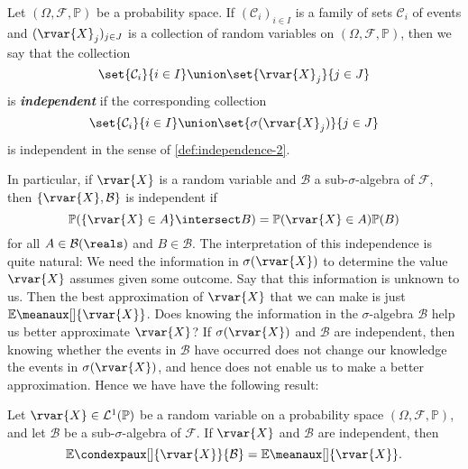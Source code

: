 \documentclass[article, a4paper, 11pt, oneside]{memoir}
\numberwithin{equation}{chapter}
\newcommand{\calB}{\mathcal{B}}
\newcommand{\calF}{\mathcal{F}}
\newcommand{\calC}{\mathcal{C}}
\newcommand{\calL}{\mathcal{L}}
\newcommand{\borel}[1]{\calB(#1)}
\renewcommand{\P}{\mathbb{P}}
\renewcommand{\mean}[2][]{\mathbb{E}\meanaux[#1]{#2}}
\newcommand{\condexp}[3][]{{\mathbb{E}\condexpaux[#1]{#2}{#3}}}
\newcommand{\keyword}[1]{{\itshape\bfseries #1}}
\begin{document}
\begin{definition}
    Let $(\Omega,\calF,\P)$ be a probability space. If $(\calC_i)_{i \in I}$ is a family of sets $\calC_i$ of events and $(\rvar{X}_j)_{j \in J}$ is a collection of random variables on $(\Omega,\calF,\P)$, then we say that the collection
    \begin{equation*}
        \set{\calC_i}{i \in I}
            \union \set{\rvar{X}_j}{j \in J}
    \end{equation*}
    is \keyword{independent} if the corresponding collection
    \begin{equation*}
        \set{\calC_i}{i \in I}
            \union \set{\sigma(\rvar{X}_j)}{j \in J}
    \end{equation*}
    is independent in the sense of \cref{def:independence-2}.
\end{definition}
%
In particular, if $\rvar{X}$ is a random variable and $\calB$ a sub-$\sigma$-algebra of $\calF$, then $\{ \rvar{X}, \calB \}$ is independent if
%
\begin{equation*}
    \P( \{\rvar{X} \in A\} \intersect B )
        = \P( \rvar{X} \in A ) \P(B)
\end{equation*}
%
for all $A \in \borel{\reals}$ and $B \in \calB$. The interpretation of this independence is quite natural: We need the information in $\sigma(\rvar{X})$ to determine the value $\rvar{X}$ assumes given some outcome. Say that this information is unknown to us. Then the best approximation of $\rvar{X}$ that we can make is just $\mean{\rvar{X}}$. Does knowing the information in the $\sigma$-algebra $\calB$ help us better approximate $\rvar{X}$? If $\sigma(\rvar{X})$ and $\calB$ are independent, then knowing whether the events in $\calB$ have occurred does not change our knowledge the events in $\sigma(\rvar{X})$, and hence does not enable us to make a better approximation. Hence we have have the following result:

\begin{proposition}
    Let $\rvar{X} \in \calL^1(\P)$ be a random variable on a probability space $(\Omega,\calF,\P)$, and let $\calB$ be a sub-$\sigma$-algebra of $\calF$. If $\rvar{X}$ and $\calB$ are independent, then
    \begin{equation*}
        \condexp{\rvar{X}}{\calB}
            = \mean{\rvar{X}}.
    \end{equation*}
\end{proposition}
\end{document}
